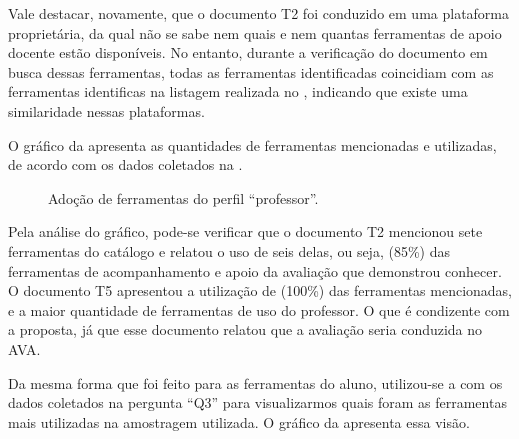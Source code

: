 Vale destacar, novamente, que o documento T2 foi conduzido em uma plataforma proprietária, da qual não se sabe nem quais e nem quantas ferramentas de apoio docente estão disponíveis. No entanto, durante a verificação do documento em busca dessas ferramentas, todas as ferramentas identificadas coincidiam com as ferramentas identificas na listagem realizada no , indicando que existe uma similaridade nessas plataformas.

O gráfico da  apresenta as quantidades de ferramentas mencionadas e utilizadas, de acordo com os dados coletados na  .

\begin{figure}[ht!]
    \centering
    \label{fig:ferram_profe}
    \caption{Adoção de ferramentas do perfil ``professor''.}
    \vspace{2mm}
    \vspace{2mm}
\end{figure}

Pela análise do gráfico, pode-se verificar que o documento T2 mencionou sete ferramentas do catálogo e relatou o uso de seis delas, ou seja, (85\%) das ferramentas de acompanhamento e apoio da avaliação que demonstrou conhecer. O documento T5 apresentou a utilização de (100\%) das ferramentas mencionadas, e a maior quantidade de ferramentas de uso do professor. O que é condizente com a proposta, já que esse documento relatou que a avaliação seria conduzida no AVA.

Da mesma forma que foi feito para as ferramentas do aluno, utilizou-se a  com os dados coletados na pergunta ``Q3'' para visualizarmos quais foram as ferramentas mais utilizadas na amostragem utilizada. O gráfico da  apresenta essa visão. 

